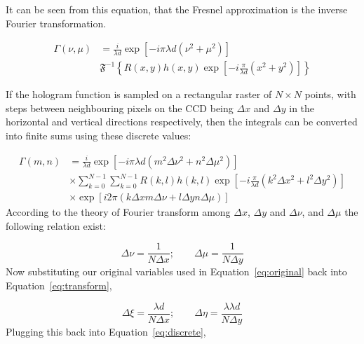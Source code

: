     It can be seen from this equation, that the Fresnel approximation is the
    inverse Fourier transformation.

    \begin{equation}
    \begin{aligned}
        \Gamma(\nu,\mu)&=\frac{i}{\lambda d}\exp\left[ -i\pi\lambda d\left(
            \nu^2+\mu^2
        \right) \right] \\
        & \mathfrak{F}^{-1}\left\{R(x,y)h(x,y)\exp\left[
            -i\frac{\pi}{\lambda d}(x^{2}+y^2)
        \right] \right\}
    \end{aligned}
    \end{equation}

    If the hologram function is sampled on a rectangular raster of $N\times N $
    points, with steps between neighbouring pixels on the CCD being $\Delta x$ and $\Delta
    y$ in the horizontal and vertical directions respectively, then the
    integrals can be converted into finite sums using these discrete values:

    \begin{equation}
    \begin{aligned}
        \Gamma(m,n) &= \frac{i}{\lambda d}\exp\left[ -i\pi \lambda d\left(
            m^2\Delta \nu^2 + n^2\Delta \mu^2
        \right)\right]\\
        & \times
        \sum_{k=0}^{N-1}\sum_{k=0}^{N-1}R(k,l)h(k,l)\exp\left[ -i
        \frac{\pi}{\lambda d}\left( k^2\Delta x^2+l^2\Delta y^2 \right)
    \right] \\
    & \times \exp\left[ i2\pi\left( k\Delta x m \Delta\nu+l\Delta y n
    \Delta\mu \right) \right]
    \end{aligned}
    \label{eq:discrete}
    \end{equation}
    According to the theory of Fourier transform among $\Delta x$, $\Delta y$
    and $\Delta\nu$, and $\Delta\mu$ the following relation exist:

    \begin{equation}
        \Delta\nu=\frac{1}{N\Delta x}; \qquad \Delta\mu=\frac{1}{N\Delta y}
        \label{eq:transform}
    \end{equation}
    Now substituting our original variables used in Equation~\ref{eq:original} back into
    Equation~\ref{eq:transform},

    \begin{equation}
        \Delta\xi=\frac{\lambda d}{N\Delta x}; \qquad \Delta\eta=\frac{\lambda
        \lambda d}{N\Delta y}
    \end{equation}
    Plugging this back into Equation~\ref{eq:discrete},

